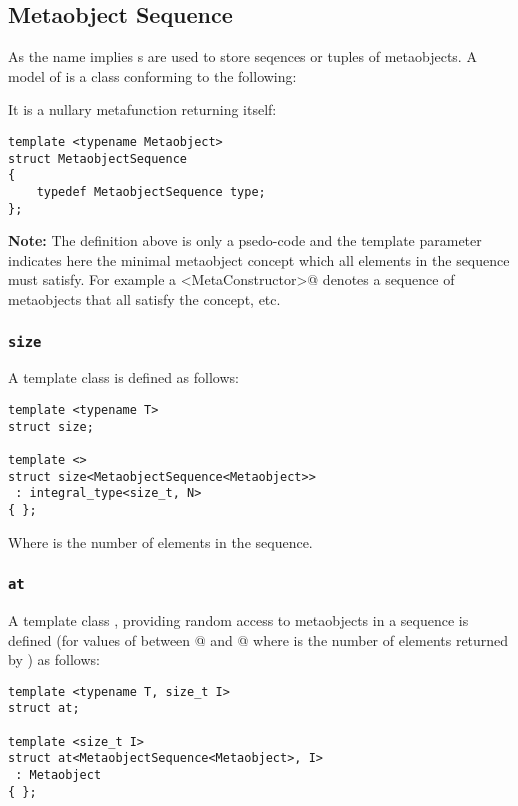 \subsection{Metaobject Sequence}
\label{concept-MetaobjectSequence}

As the name implies s are used to store seqences
or tuples of metaobjects.
A model of  is a class conforming to the following:

It is a nullary metafunction returning itself:

\begin{verbatim}
template <typename Metaobject>
struct MetaobjectSequence
{
	typedef MetaobjectSequence type;
};
\end{verbatim}

\textbf{Note:} The definition above is only a psedo-code and
the template parameter \verb@Metaobject@ indicates here the minimal
metaobject concept which all elements in the sequence must satisfy.
For example a \verb@MetaobjectSequence<MetaConstructor>@ denotes a sequence
of metaobjects that all satisfy the  concept, etc.

\subsubsection{\texttt{size}}

A template class \verb@size@ is defined as follows:

\begin{verbatim}
template <typename T>
struct size;

template <>
struct size<MetaobjectSequence<Metaobject>>
 : integral_type<size_t, N>
{ };
\end{verbatim}

Where \verb@N@ is the number of elements in the sequence.

\subsubsection{\texttt{at}}

A template class \verb@at@, providing random access to metaobjects in a sequence
is defined (for values of \verb@I@ between @ and @ where \verb@N@
is the number of elements returned by \verb@size@) as follows:

\begin{verbatim}
template <typename T, size_t I>
struct at;

template <size_t I>
struct at<MetaobjectSequence<Metaobject>, I>
 : Metaobject
{ };
\end{verbatim}

